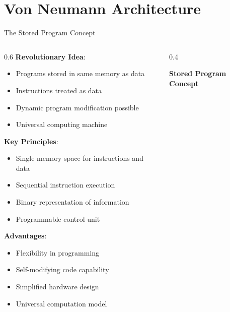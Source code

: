 \documentclass[aspectratio=169]{beamer}
\newcommand{\concept}[1]{\textbf{\color{darkblue}#1}}
\begin{document}
\section{Von Neumann Architecture}

\begin{frame}{The Stored Program Concept}
\begin{columns}
\begin{column}{0.6\textwidth}
\concept{Revolutionary Idea}:
\begin{itemize}
\item Programs stored in same memory as data
\item Instructions treated as data
\item Dynamic program modification possible
\item Universal computing machine
\end{itemize}

\vspace{0.3cm}
\concept{Key Principles}:
\begin{itemize}
\item Single memory space for instructions and data
\item Sequential instruction execution
\item Binary representation of information
\item Programmable control unit
\end{itemize}

\vspace{0.3cm}
\concept{Advantages}:
\begin{itemize}
\item Flexibility in programming
\item Self-modifying code capability
\item Simplified hardware design
\item Universal computation model
\end{itemize}
\end{column}
\begin{column}{0.4\textwidth}
\begin{center}
\textbf{Stored Program Concept}
\vspace{0.3cm}

\end{center}
\end{column}
\end{columns}
\end{frame}
\end{document}
